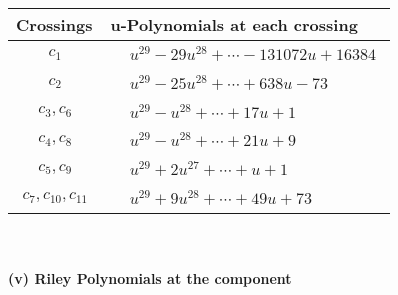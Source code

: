 \documentclass[1p]{elsarticle_modified}
\theoremstyle{definition}
\begin{document}
\begin{tabular}{m{50pt}|m{274pt}}
Crossings & \hspace{64pt}u-Polynomials at each crossing \\
\hline $$\begin{aligned}c_{1}\end{aligned}$$&$\begin{aligned}
&u^{29}-29 u^{28}+\cdots-131072 u+16384
\end{aligned}$\\
\hline $$\begin{aligned}c_{2}\end{aligned}$$&$\begin{aligned}
&u^{29}-25 u^{28}+\cdots+638 u-73
\end{aligned}$\\
\hline $$\begin{aligned}c_{3},c_{6}\end{aligned}$$&$\begin{aligned}
&u^{29}- u^{28}+\cdots+17 u+1
\end{aligned}$\\
\hline $$\begin{aligned}c_{4},c_{8}\end{aligned}$$&$\begin{aligned}
&u^{29}- u^{28}+\cdots+21 u+9
\end{aligned}$\\
\hline $$\begin{aligned}c_{5},c_{9}\end{aligned}$$&$\begin{aligned}
&u^{29}+2 u^{27}+\cdots+u+1
\end{aligned}$\\
\hline $$\begin{aligned}c_{7},c_{10},c_{11}\end{aligned}$$&$\begin{aligned}
&u^{29}+9 u^{28}+\cdots+49 u+73
\end{aligned}$\\
\hline
\end{tabular}\\~\\
\newpage\renewcommand{\arraystretch}{1}
\flushleft \textbf{(v) Riley Polynomials at the component}\newline \\
\end{document}
